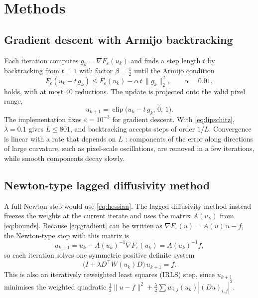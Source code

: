 \documentclass[conference,a4paper]{IEEEtran}
\newcommand{\norm}[1]{\lVert #1\rVert}
\DeclareMathOperator{\clip}{clip}
\begin{document}
\section{Methods}\label{sec:methods}

\subsection{Gradient descent with Armijo backtracking}

Each iteration computes $g_k=\nabla F_\varepsilon(u_k)$ and finds a step length $t$ by backtracking from $t=1$ with factor $\beta=\frac12$ until the Armijo condition \cite{armijo1966}
\begin{equation}
F_\varepsilon(u_k-t\,g_k)\le F_\varepsilon(u_k)-\alpha\,t\,\norm{g_k}_2^2,\qquad\alpha=0.01,
\label{eq:armijo}
\end{equation}
holds, with at most 40 reductions. The update is projected onto the valid pixel range,
\begin{equation}
u_{k+1}=\clip\bigl(u_k-t\,g_k,\,0,\,1\bigr).
\label{eq:gdupdate}
\end{equation}
The implementation fixes $\varepsilon=10^{-3}$ for gradient descent. With \eqref{eq:lipschitz}, $\lambda=0.1$ gives $L\le801$, and backtracking accepts steps of order $1/L$. Convergence is linear with a rate that depends on $L$ \cite{nocedal2006,boyd2004}: components of the error along directions of large curvature, such as pixel-scale oscillations, are removed in a few iterations, while smooth components decay slowly.

\subsection{Newton-type lagged diffusivity method}

A full Newton step would use \eqref{eq:hessian}. The lagged diffusivity method \cite{vogel1996} instead freezes the weights at the current iterate and uses the matrix $A(u_k)$ from \eqref{eq:bounds}. Because \eqref{eq:gradient} can be written as $\nabla F_\varepsilon(u)=A(u)\,u-f$, the Newton-type step with this matrix is
\begin{equation}
u_{k+1}=u_k-A(u_k)^{-1}\nabla F_\varepsilon(u_k)=A(u_k)^{-1}f,
\label{eq:irls}
\end{equation}
so each iteration solves one symmetric positive definite system
\begin{equation}
\bigl(I+\lambda D^\top W(u_k)D\bigr)\,u_{k+1}=f.
\label{eq:system}
\end{equation}
This is also an iteratively reweighted least squares (IRLS) step, since $u_{k+1}$ minimises the weighted quadratic $\frac12\norm{u-f}^2+\frac\lambda2\sum w_{i,j}(u_k)|(Du)_{i,j}|^2$.
\end{document}
